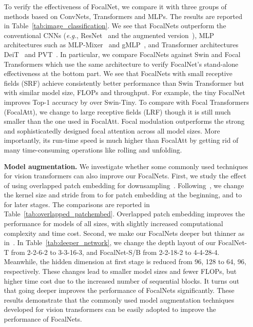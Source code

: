 \documentclass{article}
\begin{document}
To verify the effectiveness of FocalNet, we compare it with three groups of methods based on ConvNets, Transformers and MLPs. The results are reported in Table~\ref{tab:image_classification}. We see that FocalNets outperform the conventional CNNs (\textit{e.g.}, ResNet~\cite{he2016deep} and the augmented version~\cite{wightman2021resnet}), MLP architectures such as MLP-Mixer~\cite{tolstikhin2021mlp} and gMLP~\cite{liu2021pay}, and Transformer architectures DeiT~\cite{touvron2020training} and PVT~\cite{wang2021pyramid}. 
In particular, we compare FocalNets against Swin and Focal Transformers which use the same architecture to verify FocalNet's stand-alone effectiveness at the bottom part. We see that FocalNets with small receptive fields (SRF) achieve consistently better performance than Swin Transformer but with similar model size, FLOPs and throughput. 
For example, the tiny FocalNet improves Top-1 accuracy by  over Swin-Tiny. To compare with Focal Transformers (FocalAtt), we change to large receptive fields (LRF) though it is still much smaller than the one used in FocalAtt. Focal modulation outperforms the strong and sophisticatedly designed focal attention across all model sizes. More importantly, its run-time speed is much higher than FocalAtt by getting rid of many time-consuming operations like rolling and unfolding. 


\textbf{Model augmentation.} 
We investigate whether some commonly used techniques for vision transformers can also improve our FocalNets. First, we study the effect of using overlapped patch embedding for downsampling~\cite{guo2021cmt}. Following~\cite{wu2021cvt}, we change the kernel size and stride from  to  for patch embedding at the beginning, and  to  for later stages. The comparisons are reported in Table~\ref{tab:overlapped_patchembed}. Overlapped patch embedding improves the performance for models of all sizes, with slightly increased computational complexity and time cost. Second, we make our FocalNets deeper but thinner as in~\cite{dong2021cswin,zhou2021refiner}. 
In Table~\ref{tab:deeper_network}, we change the depth layout of our FocalNet-T from 2-2-6-2 to 3-3-16-3, and FocalNet-S/B from 2-2-18-2 to 4-4-28-4. Meanwhile, the hidden dimension at first stage is reduced from 96, 128 to 64, 96, respectively. These changes lead to smaller model sizes and fewer FLOPs, but higher time cost due to the increased number of sequential blocks. It turns out that going deeper improves the performance of FocalNets significantly. These results demonstrate that the commonly used model augmentation techniques developed for vision transformers can be easily adopted to improve the performance of FocalNets. 
\end{document}
